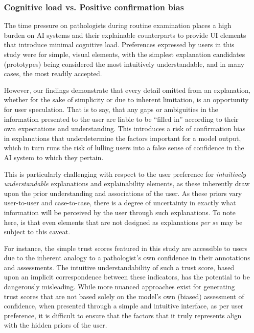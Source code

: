 \subsubsection{Cognitive load vs. Positive confirmation bias}

The time pressure on pathologists during routine examination places a high burden on AI systems and their explainable counterparts to provide UI elements that introduce minimal cognitive load. Preferences expressed by users in this study were for simple, visual elements, with the simplest explanation candidates (prototypes) being considered the most intuitively understandable, and in many cases, the most readily accepted.

However, our findings demonstrate that every detail omitted from an explanation, whether for the sake of simplicity or due to inherent limitation, is an opportunity for user speculation. That is to say, that any gaps or ambiguities in the information presented to the user are liable to be ``filled in'' according to their own expectations and understanding. This introduces a risk of confirmation bias in explanations that underdetermine the factors important for a model output, which in turn runs the risk of lulling users into a false sense of confidence in the AI system to which they pertain.

This is particularly challenging with respect to the user preference for \textit{intuitively understandable} explanations and explainability elements, as these inherently draw upon the prior understanding and associations of the user. As these priors vary user-to-user and case-to-case, there is a degree of uncertainty in exactly what information will be perceived by the user through such explanations. To note here, is that even elements that are not designed as explanations \textit{per se} may be subject to this caveat.

For instance, the simple  trust scores featured in this study are accessible to users due to the inherent analogy to a pathologist's own confidence in their annotations and assessments. The intuitive understandability of such a trust score, based upon an implicit correspondence between these indicators, has the potential to be dangerously misleading. While more nuanced approaches exist for generating trust scores that are not based solely on the model's own (biased) assessment of confidence, when presented through a simple and intuitive interface, as per user preference, it is difficult to ensure that the factors that it truly represents align with the hidden priors of the user.

